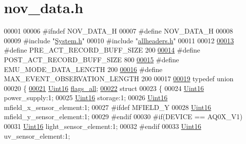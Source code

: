 \hypertarget{a00022_source}{\section{nov\+\_\+data.\+h}
\label{a00022_source}
}

\begin{DoxyCode}
00001 
00006 \textcolor{preprocessor}{#ifndef NOV\_DATA\_H}
00007 \textcolor{preprocessor}{#define NOV\_DATA\_H}
00008 
00009 \textcolor{preprocessor}{#include "\hyperlink{a00072}{System.h}"}
00010 \textcolor{preprocessor}{#include "\hyperlink{a00040}{allheaders.h}"}
00011 
00012 
\hypertarget{a00022_source_l00013}{}\hyperlink{a00022_a18dcecc16ded13fa622e0913e73442e6}{00013} \textcolor{preprocessor}{#define PRE\_ACT\_RECORD\_BUFF\_SIZE                                200}
\hypertarget{a00022_source_l00014}{}\hyperlink{a00022_ab1ad440de86fff80e517ad748de2ee39}{00014} \textcolor{preprocessor}{#define POST\_ACT\_RECORD\_BUFF\_SIZE                               800}
\hypertarget{a00022_source_l00015}{}\hyperlink{a00022_af4c3a8ad94feb4d7bda7f107f34baf41}{00015} \textcolor{preprocessor}{#define EMU\_MODE\_DATA\_LENGTH                                    200}
\hypertarget{a00022_source_l00016}{}\hyperlink{a00022_aa060aeb1ecb530b3c6f6d91060999b70}{00016} \textcolor{preprocessor}{#define MAX\_EVENT\_OBSERVATION\_LENGTH                            200}
00017 
\hypertarget{a00022_source_l00019}{}\hyperlink{a00022}{00019} \textcolor{keyword}{typedef} \textcolor{keyword}{union}
00020 \{
\hypertarget{a00022_source_l00021}{}\hyperlink{a00022_a82602ac07808604d0870a9880b62d5f4}{00021}     \hyperlink{a00072_a59a9f6be4562c327cbfb4f7e8e18f08b}{Uint16} \hyperlink{a00022_a82602ac07808604d0870a9880b62d5f4}{flags\_all};
\hypertarget{a00022_source_l00022}{}\hyperlink{a00022}{00022}     \textcolor{keyword}{struct}
00023     \{
00024         \hyperlink{a00072_a59a9f6be4562c327cbfb4f7e8e18f08b}{Uint16} power\_supply:1;
00025         \hyperlink{a00072_a59a9f6be4562c327cbfb4f7e8e18f08b}{Uint16} storage:1;
00026         \hyperlink{a00072_a59a9f6be4562c327cbfb4f7e8e18f08b}{Uint16} mfield\_x\_sensor\_element:1;
00027 \textcolor{preprocessor}{#ifdef MFIELD\_Y}
00028         \hyperlink{a00072_a59a9f6be4562c327cbfb4f7e8e18f08b}{Uint16} mfield\_y\_sensor\_element:1;
00029 \textcolor{preprocessor}{#endif}
00030 \textcolor{preprocessor}{#if(DEVICE == AQ0X\_V1)}
00031         \hyperlink{a00072_a59a9f6be4562c327cbfb4f7e8e18f08b}{Uint16} light\_sensor\_element:1;
00032 \textcolor{preprocessor}{#endif}
00033         \hyperlink{a00072_a59a9f6be4562c327cbfb4f7e8e18f08b}{Uint16} uv\_sensor\_element:1;

\end{DoxyCode}
